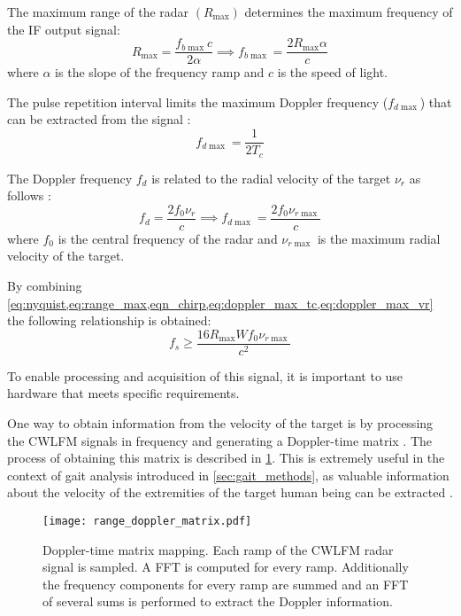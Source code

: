 The maximum range of the radar $(R_{\max})$ determines the maximum frequency of the IF output signal:
\begin{equation}\label{eq:range_max}
	R_{\max} = \frac{f_{b \max} c}{2 \alpha} \implies f_{b \max} = \frac{2R_{\max} \alpha}{c}
\end{equation}
where $\alpha$ is the slope of the frequency ramp and $c$ is the speed of light.

The pulse repetition interval limits the maximum Doppler frequency ($f_{d\max}$) that can be extracted from the signal \cite{Amin2017}:
\begin{equation} \label{eq:doppler_max_tc}
	f_{d\max} = \frac{1}{2 T_c}
\end{equation}

The Doppler frequency $f_d$ is related to the radial velocity of the target $\nu_r$ as follows \cite{Richards2010}:
\begin{equation} \label{eq:doppler_max_vr}
	f_d = \frac{2 f_0 \nu_r}{c} \implies f_{d\max} = \frac{2 f_0 \nu_{r\max}}{c}
\end{equation}
where $f_0$ is the central frequency of the radar and $\nu_{r\max}$ is the maximum radial velocity of the target.

By combining \cref{eq:nyquist,eq:range_max,eqn_chirp,eq:doppler_max_tc,eq:doppler_max_vr} the following relationship is obtained:
\begin{equation} \label{eq:fs_final}
	f_s \ge \frac{16 R_{\max}W f_0 \nu_{r\max}}{c^2}
\end{equation}

To enable processing and acquisition of this signal, it is important to use hardware that meets specific requirements.

One way to obtain information from the velocity of the target is by processing the CWLFM signals in frequency and generating a Doppler-time matrix \cite{Amin2017,Richards2010}. The process of obtaining this matrix is described in \cref{fig:range_doppler_matrix}. This is extremely useful in the context of gait analysis introduced in \cref{sec:gait_methods}, as valuable information about the velocity of the extremities of the target human being can be extracted \cite{Senigagliesi2020}.

\begin{figure}[ht]
	\centering
	\texttt{[image: range\_doppler\_matrix.pdf]}
	\caption{Doppler-time matrix mapping. Each ramp of the CWLFM radar signal is sampled. A FFT is computed for every ramp. Additionally the frequency components for every ramp are summed and an FFT of several sums is performed to extract the Doppler information.}
	\label{fig:range_doppler_matrix}
\end{figure}


